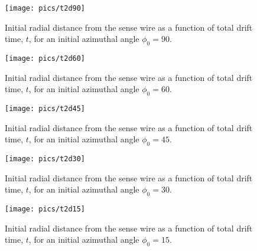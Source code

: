\documentclass[twoside]{article}
\begin{document}
\begin{multicols}{2}
\begin{figure}[H]
\label{fig:t2d90}
    \texttt{[image: pics/t2d90]}
    \caption{Initial radial distance from the sense wire as a function of total drift time, $t$, for an initial azimuthal angle $\phi_0 = 90$.}
\end{figure}
\begin{figure}[H]
\label{fig:t2d60}
    \texttt{[image: pics/t2d60]}
    \caption{Initial radial distance from the sense wire as a function of total drift time, $t$, for an initial azimuthal angle $\phi_0 = 60$.}
\end{figure}
\begin{figure}[H]
\label{fig:t2d45}
    \texttt{[image: pics/t2d45]}
    \caption{Initial radial distance from the sense wire as a function of total drift time, $t$, for an initial azimuthal angle $\phi_0 = 45$.}
\end{figure}
\begin{figure}[H]
\label{fig:t2d30}
    \texttt{[image: pics/t2d30]}
    \caption{Initial radial distance from the sense wire as a function of total drift time, $t$, for an initial azimuthal angle $\phi_0 = 30$.}
\end{figure}
\begin{figure}[H]
\label{fig:t2d15}
    \texttt{[image: pics/t2d15]}
    \caption{Initial radial distance from the sense wire as a function of total drift time, $t$, for an initial azimuthal angle $\phi_0 = 15$.}
\end{figure}



\end{multicols}
\end{document}
